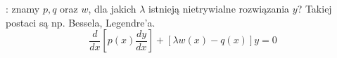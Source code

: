 :  znamy $p, q$ oraz $w$, dla jakich $\lambda$ istnieją nietrywialne rozwiązania $y$?
Takiej postaci są np. Bessela, Legendre'a.
\[
	\frac{d}{dx} \left[ p(x) \frac{dy}{dx}\right] + [\lambda w(x) - q(x)] y = 0
\]

